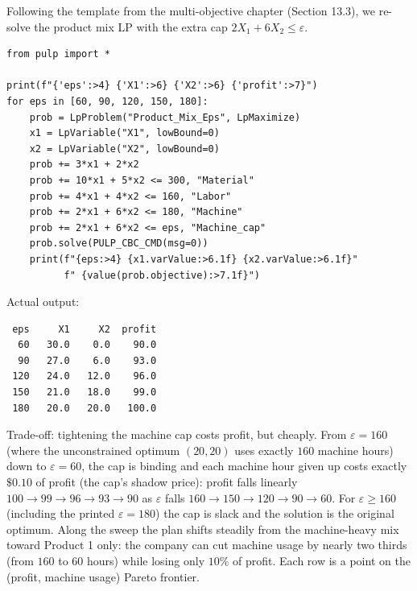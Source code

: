 Following the template from the multi-objective chapter (Section 13.3), we
re-solve the product mix LP with the extra cap $2X_1 + 6X_2 \leq \varepsilon$.

\begin{verbatim}
from pulp import *

print(f"{'eps':>4} {'X1':>6} {'X2':>6} {'profit':>7}")
for eps in [60, 90, 120, 150, 180]:
    prob = LpProblem("Product_Mix_Eps", LpMaximize)
    x1 = LpVariable("X1", lowBound=0)
    x2 = LpVariable("X2", lowBound=0)
    prob += 3*x1 + 2*x2
    prob += 10*x1 + 5*x2 <= 300, "Material"
    prob += 4*x1 + 4*x2 <= 160, "Labor"
    prob += 2*x1 + 6*x2 <= 180, "Machine"
    prob += 2*x1 + 6*x2 <= eps, "Machine_cap"
    prob.solve(PULP_CBC_CMD(msg=0))
    print(f"{eps:>4} {x1.varValue:>6.1f} {x2.varValue:>6.1f}"
          f" {value(prob.objective):>7.1f}")
\end{verbatim}

Actual output:

\begin{verbatim}
 eps     X1     X2  profit
  60   30.0    0.0    90.0
  90   27.0    6.0    93.0
 120   24.0   12.0    96.0
 150   21.0   18.0    99.0
 180   20.0   20.0   100.0
\end{verbatim}

Trade-off: tightening the machine cap costs profit, but cheaply. From
$\varepsilon = 160$ (where the unconstrained optimum $(20,20)$ uses exactly
$160$ machine hours) down to $\varepsilon = 60$, the cap is binding and each
machine hour given up costs exactly $\$0.10$ of profit (the cap's shadow
price): profit falls linearly $100 \to 99 \to 96 \to 93 \to 90$ as
$\varepsilon$ falls $160 \to 150 \to 120 \to 90 \to 60$. For
$\varepsilon \geq 160$ (including the printed $\varepsilon = 180$) the cap is
slack and the solution is the original optimum. Along the sweep the plan
shifts steadily from the machine-heavy mix toward Product 1 only: the company
can cut machine usage by nearly two thirds (from $160$ to $60$ hours) while
losing only $10\%$ of profit. Each row is a point on the (profit, machine
usage) Pareto frontier.


